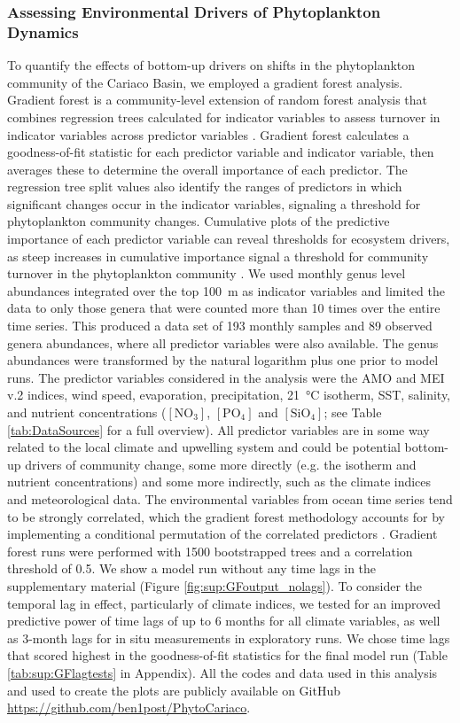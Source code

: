 \documentclass[draft]{agujournal2019}
\begin{document}
    \subsubsection{Assessing Environmental Drivers of Phytoplankton Dynamics}
    To quantify the effects of bottom-up drivers on shifts in the phytoplankton community of the Cariaco Basin, we employed a gradient forest analysis. Gradient forest is a community-level extension of random forest analysis that combines regression trees calculated for indicator variables to assess turnover in indicator variables across predictor variables \cite{pitcher_example_2012, large_critical_2015, tam_comparing_2017}. Gradient forest calculates a goodness-of-fit statistic for each predictor variable and indicator variable, then averages these to determine the overall importance of each predictor. The regression tree split values also identify the ranges of predictors in which significant changes occur in the indicator variables, signaling a threshold for phytoplankton community changes. Cumulative plots of the predictive importance of each predictor variable can reveal thresholds for ecosystem drivers, as steep increases in cumulative importance signal a threshold for community turnover in the phytoplankton community \cite{tam_comparing_2017}. We used monthly genus level abundances integrated over the top \qty{100}{\meter} as indicator variables and limited the data to only those genera that were counted more than 10 times over the entire time series. This produced a data set of 193 monthly samples and 89 observed genera abundances, where all predictor variables were also available. The genus abundances were transformed by the natural logarithm plus one prior to model runs. The predictor variables considered in the analysis were the AMO and MEI v.2 indices, wind speed, evaporation, precipitation, \qty{21}{\celsius} isotherm, SST, salinity, and nutrient concentrations ($\mathrm{[NO_3]}$, $\mathrm{[PO_4]}$ and $\mathrm{[SiO_4]}$; see Table \ref{tab:DataSources} for a full overview). All predictor variables are in some way related to the local climate and upwelling system and could be potential bottom-up drivers of community change, some more directly (e.g. the isotherm and nutrient concentrations) and some more indirectly, such as the climate indices and meteorological data. 
    The environmental variables from ocean time series tend to be strongly correlated, which the gradient forest methodology accounts for by implementing a conditional permutation of the correlated predictors \cite{ellis_gradient_2012}. Gradient forest runs were performed with 1500 bootstrapped trees and a correlation threshold of 0.5.
    We show a model run without any time lags in the supplementary material (Figure \ref{fig:sup:GFoutput_nolags}). To consider the temporal lag in effect, particularly of climate indices, we tested for an improved predictive power of time lags of up to 6 months for all climate variables, as well as 3-month lags for in situ measurements in exploratory runs. We chose time lags that scored highest in the goodness-of-fit statistics for the final model run (Table \ref{tab:sup:GFlagtests} in Appendix). All the codes and data used in this analysis and used to create the plots are publicly available on GitHub \url{https://github.com/ben1post/PhytoCariaco}.
\end{document}

